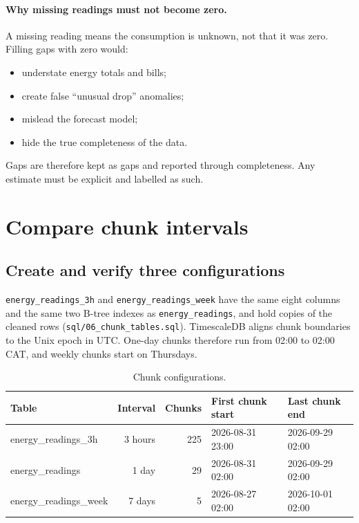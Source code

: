 \documentclass[11pt,a4paper]{article}
\begin{document}
\paragraph{Why missing readings must not become zero.}
A missing reading means the consumption is unknown, not that it was zero. Filling gaps
with zero would:
\begin{itemize}
\item understate energy totals and bills;
\item create false ``unusual drop'' anomalies;
\item mislead the forecast model;
\item hide the true completeness of the data.
\end{itemize}
Gaps are therefore kept as gaps and reported through completeness. Any estimate must be
explicit and labelled as such.


\section{Compare chunk intervals}

\subsection{Create and verify three configurations}
\texttt{energy\_readings\_3h} and \texttt{energy\_readings\_week} have the same eight
columns and the same two B-tree indexes as \texttt{energy\_readings}, and hold copies
of the cleaned rows (\texttt{sql/06\_chunk\_tables.sql}).
TimescaleDB aligns chunk boundaries to the Unix epoch in UTC. One-day chunks therefore
run from 02:00 to 02:00 CAT, and weekly chunks start on Thursdays.

\begin{table}[H]\centering\small
\begin{tabular}{lrrll}\toprule
Table & Interval & Chunks & First chunk start & Last chunk end\\\midrule
energy\_readings\_3h & 3 hours & 225 & 2026-08-31 23:00 & 2026-09-29 02:00\\
energy\_readings & 1 day & 29 & 2026-08-31 02:00 & 2026-09-29 02:00\\
energy\_readings\_week & 7 days & 5 & 2026-08-27 02:00 & 2026-10-01 02:00\\\bottomrule
\end{tabular}
\caption{Chunk configurations.}
\end{table}
\end{document}
